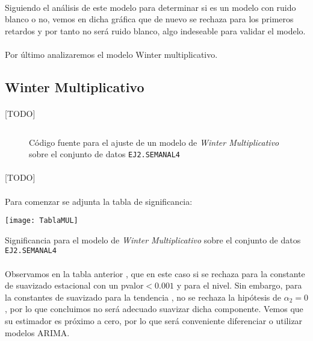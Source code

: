 \documentclass[a4paper, spanish]{article}
\begin{document}
      \paragraph{}
      Siguiendo el análisis de este modelo para determinar si es un modelo con ruido blanco o no, vemos en dicha gráfica que de nuevo se rechaza para los primeros retardos y por tanto no será ruido blanco, algo indeseable para validar el modelo.

      \paragraph{}
      Por último analizaremos el modelo Winter multiplicativo.

    \subsection{Winter Multiplicativo}

      \paragraph{}
      [TODO]

      \begin{figure}[htb!]
        \centering
        \inputminted{SAS}{./res/code/b-01-esm-wintermul.sas}
        \caption{Código fuente para el ajuste de un modelo de \emph{Winter Multiplicativo} sobre el conjunto de datos \texttt{EJ2.SEMANAL4}}
        \label{code:b_winter_multiplicative_esm}
      \end{figure}

      \paragraph{}
      [TODO]

      \paragraph{}
      Para comenzar se adjunta la tabla de significancia:

      \begin{table}[htb!]
        \centering
        \texttt{[image: TablaMUL]}
        \caption{Significancia para el modelo de \emph{Winter Multiplicativo} sobre el conjunto de datos \texttt{EJ2.SEMANAL4}}
        \label{table:b_winter_multiplicative_significance}
      \end{table}

      \paragraph{}
      Observamos en la tabla anterior , que en este caso si se rechaza para la constante de suavizado estacional con un pvalor$ <0.001$ y para el nivel. Sin embargo, para la constantes de suavizado para la tendencia , no se rechaza la hipótesis de $\alpha_2 =0$, por lo que concluimos no será adecuado suavizar dicha componente. Vemos que su estimador es próximo a cero, por lo que será conveniente diferenciar o utilizar modelos ARIMA.
\end{document}
